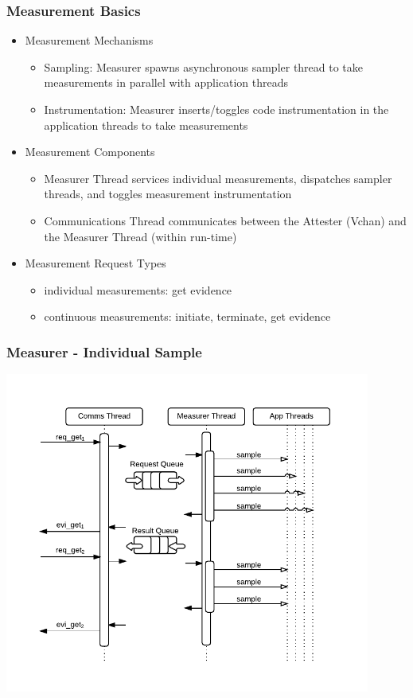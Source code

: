 \documentclass{beamer}
\begin{document}
\begin{frame}
  \frametitle{Measurement Basics}
  \begin{itemize}
  \item Measurement Mechanisms
    \begin{itemize}
    \item Sampling: Measurer spawns asynchronous sampler thread to take measurements in parallel with application threads
    \item Instrumentation: Measurer inserts/toggles code instrumentation in the application threads to take measurements
    \end{itemize}    
   \item Measurement Components 
    \begin{itemize}
    \item Measurer Thread services individual measurements, dispatches sampler threads, and toggles measurement instrumentation
    \item Communications Thread communicates between the Attester (Vchan) and the Measurer Thread (within run-time)
    \end{itemize}    
   \item Measurement Request Types 
    \begin{itemize}
    \item individual measurements: get evidence
    \item continuous measurements: initiate, terminate, get evidence
    \end{itemize}
  \end{itemize}
\end{frame}

\begin{frame}
  \frametitle{Measurer - Individual Sample}
  \begin{center}
  \includegraphics[width=0.9\textwidth]{figures/Measurer_Basic.pdf}
  \end{center}  
\end{frame}
\end{document}
